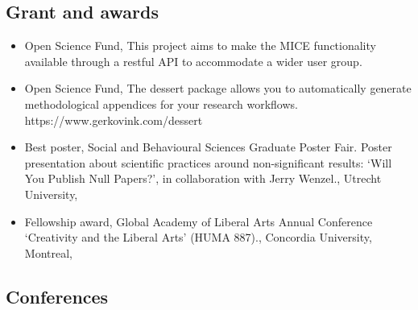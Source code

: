 \documentclass[
  letterpaper,
  DIV=11,
  numbers=noendperiod,
  oneside]{scrartcl}
\providecommand{\tightlist}{%
  \setlength{\itemsep}{0pt}\setlength{\parskip}{0pt}}\usepackage{longtable,booktabs,array}
\begin{document}
\hypertarget{grant-and-awards}{%
\subsection{Grant and awards}\label{grant-and-awards}}

{}

\begin{itemize}
\tightlist
\item
  Open Science Fund, This project aims to make the MICE functionality
  available through a restful API to accommodate a wider user group.
\end{itemize}

{}

\begin{itemize}
\tightlist
\item
  Open Science Fund, The dessert package allows you to automatically
  generate methodological appendices for your research workflows.
  https://www.gerkovink.com/dessert
\end{itemize}

{}

\begin{itemize}
\tightlist
\item
  Best poster, Social and Behavioural Sciences Graduate Poster Fair.
  Poster presentation about scientific practices around non-significant
  results: `Will You Publish Null Papers?', in collaboration with Jerry
  Wenzel., Utrecht University,
\end{itemize}

{}

\begin{itemize}
\tightlist
\item
  Fellowship award, Global Academy of Liberal Arts Annual Conference
  `Creativity and the Liberal Arts' (HUMA 887)., Concordia University,
  Montreal,
\end{itemize}

\hypertarget{conferences}{%
\subsection{Conferences}\label{conferences}}
\end{document}
